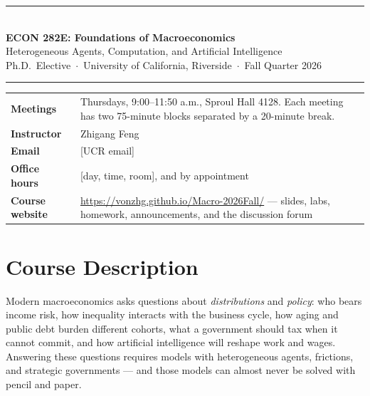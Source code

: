 \documentclass[11pt]{article}
\newcommand{\tba}[1]{\textcolor{red!70!black}{[#1]}}
\begin{document}
\begin{center}
{\color{UCRBlue}\rule{\linewidth}{2pt}}\\[0.4em]
{\LARGE\bfseries ECON 282E: Foundations of Macroeconomics}\\[0.35em]
{\large Heterogeneous Agents, Computation, and Artificial Intelligence}\\[0.35em]
{\normalsize Ph.D.\ Elective \,$\cdot$\, University of California, Riverside \,$\cdot$\, Fall Quarter 2026}\\[0.2em]
{\color{UCRGold}\rule{\linewidth}{1pt}}
\end{center}

\begin{tabularx}{\linewidth}{@{}p{3.2cm}L@{}}
\textbf{Meetings} & Thursdays, 9:00--11:50 a.m., Sproul Hall 4128. Each meeting has two 75-minute blocks separated by a 20-minute break. \\
\textbf{Instructor} & Zhigang Feng \\
\textbf{Email} & \tba{UCR email} \\
\textbf{Office hours} & \tba{day, time, room}, and by appointment \\
\textbf{Course website} & \url{https://vonzhg.github.io/Macro-2026Fall/} --- slides, labs, homework, announcements, and the discussion forum \\
\end{tabularx}

\section{Course Description}

Modern macroeconomics asks questions about \emph{distributions} and \emph{policy}: who bears income risk, how inequality interacts with the business cycle, how aging and public debt burden different cohorts, what a government should tax when it cannot commit, and how artificial intelligence will reshape work and wages. Answering these questions requires models with heterogeneous agents, frictions, and strategic governments --- and those models can almost never be solved with pencil and paper.
\end{document}
